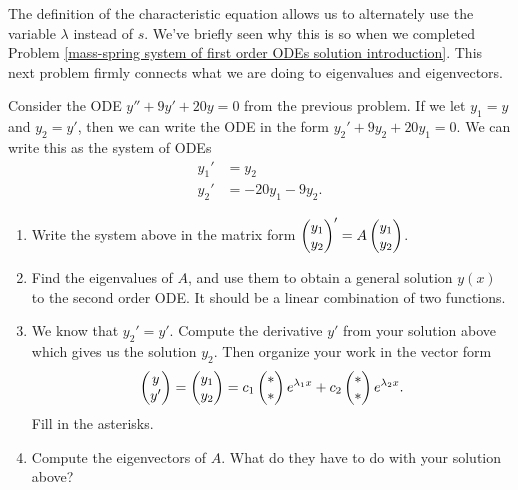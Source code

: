 The definition of the characteristic equation allows us to alternately use the variable $\lambda$ instead of $s$.  We've briefly seen why this is so when we completed Problem \ref{mass-spring system of first order ODEs solution introduction}.
This next problem firmly connects what we are doing to eigenvalues and eigenvectors. 
\begin{problem}
 Consider the ODE $y''+9y'+20y=0$ from the previous problem.  If we let $y_1=y$ and $y_2=y'$, then we can write the ODE in the form $y_2'+9y_2+20y_1=0$.  We can write this as the system of ODEs
\begin{align*}
 y_1'&=y_2\\
 y_2'&=-20y_1-9y_2.
\end{align*}
\begin{enumerate}
 \item 
{}%
Write the system above in the matrix form $\begin{pmatrix} y_1\\y_2 \end{pmatrix}' = A \begin{pmatrix} y_1\\y_2 \end{pmatrix}$. 
\item Find the eigenvalues of $A$, and use them to obtain a general solution $y(x)$ to the second order ODE. It should be a linear combination of two functions.
\item We know that $y_2'=y'$.  Compute the derivative $y'$ from your solution above which gives us the solution $y_2$. Then organize your work in the vector form 
$$\begin{pmatrix} y\\y' \end{pmatrix}=\begin{pmatrix} y_1\\y_2 \end{pmatrix} = c_1\begin{pmatrix} *\\ * \end{pmatrix}e^{\lambda _1 x}+c_2\begin{pmatrix} *\\ * \end{pmatrix}e^{\lambda_2 x}.$$
Fill in the asterisks.
\item Compute the eigenvectors of $A$. What do they have to do with your solution above?
\end{enumerate}
\end{problem}




















